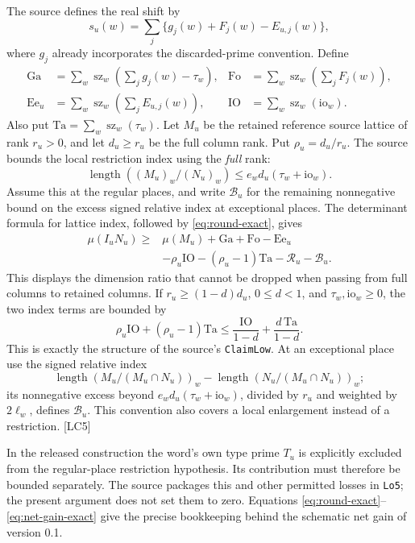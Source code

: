 The source defines the real shift by
\[
s_u(w)=\sum_j\{g_j(w)+F_j(w)-E_{u,j}(w)\},
\]
where $g_j$ already incorporates the discarded-prime convention. Define
\begin{align*}
\mathrm{Ga}&=\sum_w\operatorname{sz}_w\!\left(\sum_jg_j(w)-\tau_w\right),&
\mathrm{Fo}&=\sum_w\operatorname{sz}_w\!\left(\sum_jF_j(w)\right),\\
\mathrm{Ee}_u&=\sum_w\operatorname{sz}_w\!\left(\sum_jE_{u,j}(w)\right),&
\mathrm{IO}&=\sum_w\operatorname{sz}_w(\mathrm{io}_w).
\end{align*}
Also put $\mathrm{Ta}=\sum_w\operatorname{sz}_w(\tau_w)$. Let $M_u$ be the retained reference source lattice of rank $r_u>0$, and let $d_u\ge r_u$ be the full column rank. Put $\rho_u=d_u/r_u$. The source bounds the local restriction index using the \emph{full} rank:
\[
\operatorname{length}((M_u)_w/(N_u)_w)
\le e_w d_u(\tau_w+\mathrm{io}_w).
\]
Assume this at the regular places, and write $\mathcal B_u$ for the remaining nonnegative bound on the excess signed relative index at exceptional places. The determinant formula for lattice index, followed by \eqref{eq:round-exact}, gives
\begin{equation}\label{eq:net-gain-exact}
\begin{split}
\mu(I_uN_u)\ge{}&\mu(M_u)+\mathrm{Ga}+\mathrm{Fo}-\mathrm{Ee}_u\\
&-\rho_u\mathrm{IO}-(\rho_u-1)\mathrm{Ta}-\mathcal R_u-\mathcal B_u.
\end{split}
\end{equation}
This displays the dimension ratio that cannot be dropped when passing from full columns to retained columns. If $r_u\ge(1-d)d_u$, $0\le d<1$, and $\tau_w,\mathrm{io}_w\ge0$, the two index terms are bounded by
\[
\rho_u\mathrm{IO}+(\rho_u-1)\mathrm{Ta}
\le\frac{\mathrm{IO}}{1-d}+\frac{d\,\mathrm{Ta}}{1-d}.
\]
This is exactly the structure of the source's \texttt{ClaimLow}. At an exceptional place use the signed relative index
\[
\operatorname{length}(M_u/(M_u\cap N_u))_w
-\operatorname{length}(N_u/(M_u\cap N_u))_w;
\]
its nonnegative excess beyond $e_wd_u(\tau_w+\mathrm{io}_w)$, divided by $r_u$ and weighted by $2\ell_w$, defines $\mathcal B_u$. This convention also covers a local enlargement instead of a restriction. \textsf{[LC5]}

In the released construction the word's own type prime $T_u$ is explicitly excluded from the regular-place restriction hypothesis. Its contribution must therefore be bounded separately. The source packages this and other permitted losses in \texttt{Lo5}; the present argument does not set them to zero. Equations \eqref{eq:round-exact}--\eqref{eq:net-gain-exact} give the precise bookkeeping behind the schematic net gain of version 0.1.\cite{local-div-defs,local-costs}

